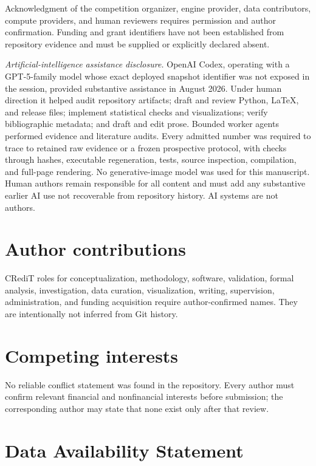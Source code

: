 \documentclass[aps,reprint,superscriptaddress,longbibliography,floatfix]{revtex4-2}
\begin{document}
\begin{acknowledgments}
Acknowledgment of the competition organizer, engine provider, data contributors,
compute providers, and human reviewers requires permission and author
confirmation.  Funding and grant identifiers have not been established from
repository evidence and must be supplied or explicitly declared absent.

\medskip
\noindent\textit{Artificial-intelligence assistance disclosure.}
OpenAI Codex, operating with a GPT-5-family model whose exact deployed snapshot
identifier was not exposed in the session, provided substantive assistance in
August 2026.  Under human direction it helped audit repository artifacts; draft
and review Python, \LaTeX, and release files; implement statistical checks and
visualizations; verify bibliographic metadata; and draft and edit prose.
Bounded worker agents performed evidence and literature audits.  Every admitted
number was required to trace to retained raw evidence or a frozen prospective
protocol, with checks through hashes, executable regeneration, tests, source
inspection, compilation, and full-page rendering.  No generative-image model
was used for this manuscript.  Human authors remain responsible for all content
and must add any substantive earlier AI use not recoverable from repository
history.  AI systems are not authors.
\end{acknowledgments}

\section*{Author contributions}

CRediT roles for conceptualization, methodology, software, validation, formal
analysis, investigation, data curation, visualization, writing, supervision,
administration, and funding acquisition require author-confirmed names.  They
are intentionally not inferred from Git history.

\section*{Competing interests}

No reliable conflict statement was found in the repository.  Every author must
confirm relevant financial and nonfinancial interests before submission; the
corresponding author may state that none exist only after that review.

\section*{Data Availability Statement}
\end{document}
